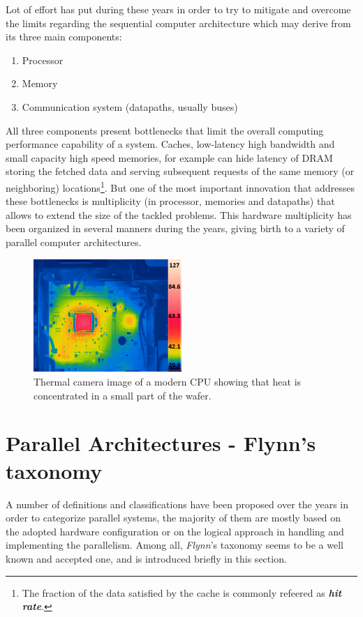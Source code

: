 Lot of effort has put during these years in order to try to mitigate and overcome the limits regarding the sequential computer architecture which may derive from its three main components:
\begin{enumerate}
\item  Processor
\item Memory
\item  Communication system (datapaths, usually buses)
\end{enumerate}
All three components present bottlenecks that limit the overall computing performance capability of a system. Caches, low-latency high bandwidth and small capacity high speed memories, for example can hide latency of DRAM storing the fetched data and serving subsequent requests of the same memory (or neighboring) locations\footnote{The fraction of the data satisfied by the cache is commonly refeered as \textit{\textbf{hit rate}}.}. But one of the most important innovation that addresses these bottlenecks is multiplicity (in processor, memories and datapaths) that allows to extend the size of the tackled problems. This hardware multiplicity has been organized in several manners during the years, giving birth to a variety of parallel computer architectures.

\begin{figure}[!htbp]
	\centering
	\includegraphics[width=0.5\textwidth]{./images/parallel_programming/heat_cpu}
	\caption[CPU and Motherboard Temperature.]{Thermal camera image of a modern CPU showing that heat is concentrated in a small part of the wafer.}\label{fig:tempCPU_thermal}
\end{figure}

\section{Parallel Architectures - Flynn's taxonomy}
\label{sec:flynn_tax}
A number of definitions and classifications have been proposed  over the years in order to categorize parallel systems, the majority of them are mostly based on the adopted hardware configuration or on the logical approach in handling and implementing the parallelism. Among all, \textit{Flynn}'s  taxonomy \cite{flynn:1972,duncan:1990} seems to be a well known and accepted one, and is  introduced briefly in this section.

